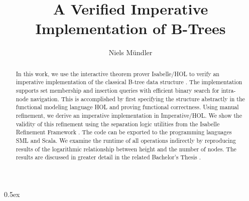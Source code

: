 \documentclass[11pt,a4paper]{article}
\begin{document}
\title{A Verified Imperative Implementation of B-Trees}
\author{Niels Mündler}
\date{}
\maketitle

\begin{abstract}
In this work, we use the interactive theorem prover Isabelle/HOL
to verify an imperative implementation of the classical B-tree data structure \cite{DBLP:journals/acta/BayerM72}.
The implementation supports set membership and insertion queries
with efficient binary search for intra-node navigation.
This is accomplished by first specifying the structure abstractly 
in the functional modeling language HOL and proving functional correctness.
Using manual refinement, we derive an imperative implementation
in Imperative/HOL.
We show the validity of this refinement using
the separation logic utilities from the
Isabelle Refinement Framework \cite{Refine_Imperative_HOL-AFP}. 
The code can be exported to the programming languages SML and Scala.
We examine the runtime of all operations indirectly by reproducing results
of the logarithmic relationship between height and the number of nodes.
The results are discussed in greater detail in the related Bachelor's Thesis
\cite{TODOownBT}.
\end{abstract}

\tableofcontents

\parindent 0pt\parskip 0.5ex



{\raggedright


}
\end{document}

